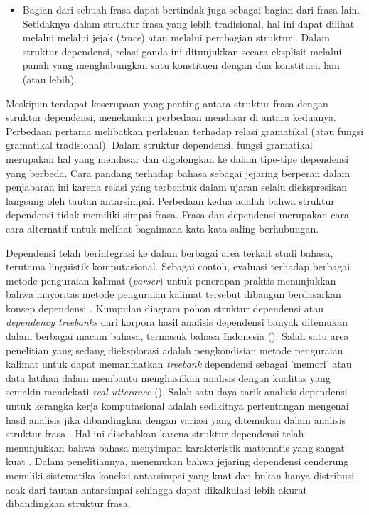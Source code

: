 \begin{itemize}
\item Bagian dari sebuah frasa dapat bertindak juga sebagai bagian dari frasa lain. Setidaknya dalam struktur frasa yang lebih tradisional, hal ini dapat dilihat melalui melalui jejak (\textit{trace}) \citep{chomsky1986barriers} atau melalui pembagian struktur \citep{pollard1994head}. Dalam struktur dependensi, relasi ganda ini ditunjukkan secara eksplisit melalui panah yang menghubungkan satu konstituen dengan dua konstituen lain (atau lebih).
\end{itemize}

Meskipun terdapat keserupaan yang penting antara struktur frasa dengan struktur dependensi, \cite{hudson2007language} menekankan perbedaan mendasar di antara keduanya. Perbedaan pertama melibatkan perlakuan terhadap relasi gramatikal (atau fungsi gramatikal tradisional). Dalam struktur dependensi, fungsi gramatikal merupakan hal yang mendasar dan digolongkan ke dalam tipe-tipe dependensi yang berbeda. Cara pandang \cite{hudson2007language} terhadap bahasa sebagai jejaring berperan dalam penjabaran ini karena relasi yang terbentuk dalam ujaran selalu diekspresikan langsung oleh tautan antarsimpai. Perbedaan kedua adalah bahwa struktur dependensi tidak memiliki simpai frasa. Frasa dan dependensi merupakan cara-cara alternatif untuk melihat bagaimana kata-kata saling berhubungan.  

Dependensi telah berintegrasi ke dalam berbagai area terkait studi bahasa, terutama linguistik komputasional. Sebagai contoh, evaluasi terhadap berbagai metode penguraian kalimat (\textit{parser}) untuk penerapan praktis menunjukkan bahwa mayoritas metode penguraian kalimat tersebut dibangun berdasarkan konsep dependensi \citep{molla2000answer}. Kumpulan diagram pohon struktur dependensi atau \textit{dependency treebanks} dari korpora hasil analisis dependensi banyak ditemukan dalam berbagai macam bahasa, termasuk bahasa Indonesia (\citealp{marcus1993building, abeille2004enriching, carroll2003parser, lin2003dependency, green2012indonesian}). Salah satu area penelitian yang sedang dieksplorasi adalah pengkondisian metode penguraian kalimat untuk dapat memanfaatkan \textit{treebank} dependensi sebagai 'memori' atau data latihan dalam membantu menghasilkan analisis dengan kualitas yang semakin mendekati \textit{real utterance} (\citealp{nivre2006maltparser, nivre2004incrementality}). Salah satu daya tarik analisis dependensi untuk kerangka kerja komputasional adalah sedikitnya pertentangan mengenai hasil analisis jika dibandingkan dengan variasi yang ditemukan dalam analisis struktur frasa \citep{carroll2003parser}. Hal ini disebabkan karena struktur dependensi telah menunjukkan bahwa bahasa menyimpan karakteristik matematis yang sangat kuat \citep{i2004patterns}. Dalam penelitiannya, \cite{i2004patterns} menemukan bahwa jejaring dependensi cenderung memiliki sistematika koneksi antarsimpai yang kuat dan bukan hanya distribusi acak dari tautan antarsimpai sehingga dapat dikalkulasi lebih akurat dibandingkan struktur frasa.


